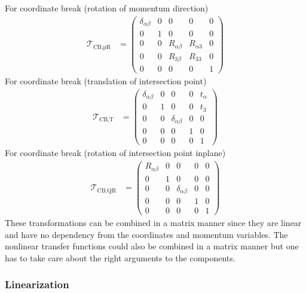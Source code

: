 \documentclass[12pt,a4paper,twoside,openright,BCOR10mm,headsepline,titlepage,abstracton,chapterprefix,final]{scrreprt}
\begin{document}
For coordinate break (rotation of momentum direction)
\begin{align}
 \mathcal{T}_{\text{CB,pR}} &=
 \begin{pmatrix}
  \delta_{\alpha\beta} & 0 &  0 & 0 & 0\\
   0                   & 1 & 0 & 0 & 0\\
   0                   & 0 & R_{\alpha\beta} & R_{\alpha 3} & 0 \\
   0                   & 0 & R_{3\beta} & R_{33} & 0 \\
   0 & 0 & 0 & 0 & 1
 \end{pmatrix}
\end{align}
For coordinate break (translation of intersection point)
\begin{align}
 \mathcal{T}_{\text{CB,T}} &=
 \begin{pmatrix}
  \delta_{\alpha\beta} & 0 &  0 & 0 & t_\alpha\\
   0                   & 1 & 0 & 0 & t_3\\
   0                   & 0 & \delta_{\alpha\beta} & 0 & 0 \\
   0                   & 0 & 0 & 1 & 0 \\
   0 & 0 & 0 & 0 & 1
 \end{pmatrix}
\end{align}
For coordinate break (rotation of intersection point inplane)
\begin{align}
 \mathcal{T}_{\text{CB,QR}} &=
 \begin{pmatrix}
  R_{\alpha\beta} & 0 &  0 & 0 & 0\\
   0                   & 1 & 0 & 0 & 0\\
   0                   & 0 & \delta_{\alpha\beta} & 0 & 0 \\
   0                   & 0 & 0 & 1 & 0 \\
   0 & 0 & 0 & 0 & 1
 \end{pmatrix}
\end{align}
These transformations can be combined in a matrix manner since they
are linear and have no dependency from the coordinates and momentum variables.
The nonlinear transfer functions could also be combined in a matrix manner but
one has to take care about the right arguments to the components.


\subsubsection{Linearization}
\end{document}
